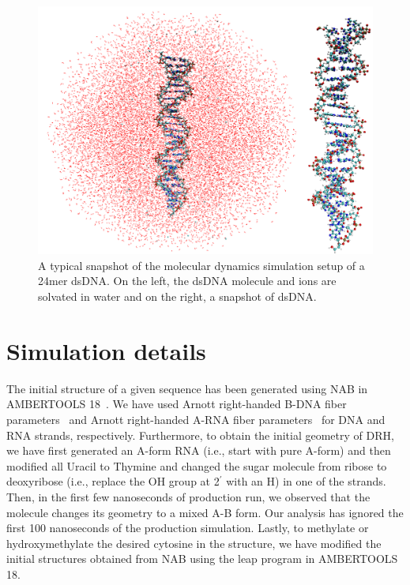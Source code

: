 \begin{figure}[htb]
\begin{center}
\centering\includegraphics[scale=.165]{images/sample_img.png}
\caption{A typical snapshot of the molecular dynamics simulation setup of a 24mer dsDNA. On the left, the dsDNA molecule and ions are solvated in water and on the right, a snapshot of dsDNA.}
\label{c3:fig1}
\end{center}
\end{figure}

\section{Simulation details}\label{c3:s2}
The initial structure of a given sequence has been generated using NAB in AMBERTOOLS 18~\cite{amber}.
We have used Arnott right-handed B-DNA fiber parameters~\cite{arnott} and Arnott right-handed A-RNA fiber parameters~\cite{arnottrna} for DNA and RNA strands, respectively.
Furthermore, to obtain the initial geometry of DRH, we have first generated an A-form RNA (i.e., start with pure A-form) and then modified all Uracil to Thymine and changed the sugar molecule from ribose to deoxyribose (i.e., replace the OH group at 2$^\prime$ with an H) in one of the strands.
Then, in the first few nanoseconds of production run, we observed that the molecule changes its geometry to a mixed A-B form.
Our analysis has ignored the first 100 nanoseconds of the production simulation.
Lastly, to methylate or hydroxymethylate the desired cytosine in the structure, we have modified the initial structures obtained from NAB using the leap program in AMBERTOOLS 18. \clearpage

